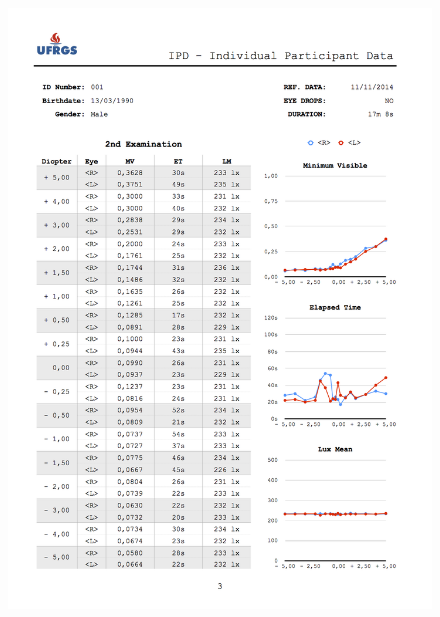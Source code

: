 \begin{figure}[h]
	
	\centering
	\includegraphics[width=1.0\linewidth]{__Images/08/IPD_001_3.png}
\end{figure}

